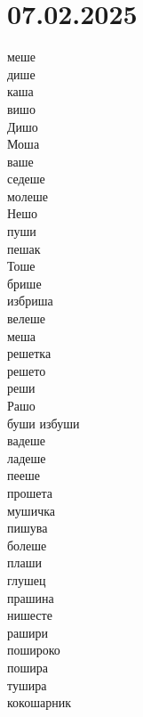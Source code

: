 \documentclass[a5paper,12pt]{article}
\newenvironment{activity}[1]{%
  \begin{tcolorbox}[colback=boxcolor,colframe=titlecolor,title={\textbf{#1}},fonttitle=\bfseries]
}{%
  \end{tcolorbox}
}
\begin{document}
\section{07.02.2025}
\begin{activity}{Зборчиња}
\begin{multicols}{4}
меше\\ дише\\ каша\\ вишо\\ Дишо\\ Моша\\ ваше\\ седеше\\ молеше\\ Нешо\\ пуши\\ пешак\\ Тоше\\ брише\\ избриша\\ велеше\\ меша\\ решетка\\ решето\\ реши\\ Рашо\\ буши
избуши\\ вадеше\\ ладеше\\ пееше\\ прошета\\ мушичка\\ пишува\\ болеше\\ плаши\\ глушец\\ прашина\\ нишесте\\ рашири\\ пошироко\\ пошира\\ тушира\\ кокошарник
\end{multicols}
\end{activity}
\end{document}
